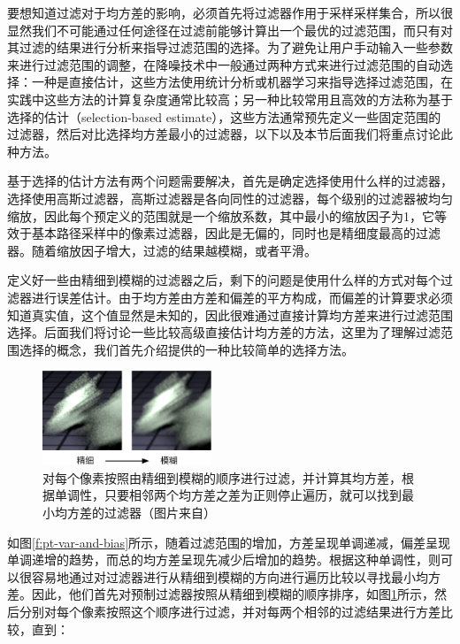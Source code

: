 要想知道过滤对于均方差的影响，必须首先将过滤器作用于采样采样集合，所以很显然我们不可能通过任何途径在过滤前能够计算出一个最优的过滤范围，而只有对其过滤的结果进行分析来指导过滤范围的选择。为了避免让用户手动输入一些参数来进行过滤范围的调整，在降噪技术中一般通过两种方式来进行过滤范围的自动选择：一种是直接估计，这些方法使用统计分析\cite{a:OnFilteringtheNoisefromtheRandomParametersinMonteCarloRendering}或机器学习\cite{a:AmachinelearningapproachforfilteringMonteCarlonoise}来指导选择过滤范围，在实践中这些方法的计算复杂度通常比较高；另一种比较常用且高效的方法称为基于选择的估计（selection-based estimate），这些方法通常预先定义一些固定范围的过滤器，然后对比选择均方差最小的过滤器，以下以及本节后面我们将重点讨论此种方法。

基于选择的估计方法有两个问题需要解决，首先是确定选择使用什么样的过滤器，\cite{a:AdaptiveSamplingandReconstructionusingGreedyErrorMinimization}选择使用高斯过滤器，高斯过滤器是各向同性的过滤器，每个级别的过滤器被均匀缩放，因此每个预定义的范围就是一个缩放系数，其中最小的缩放因子为1，它等效于基本路径采样中的像素过滤器，因此是无偏的，同时也是精细度最高的过滤器。随着缩放因子增大，过滤的结果越模糊，或者平滑。

定义好一些由精细到模糊的过滤器之后，剩下的问题是使用什么样的方式对每个过滤器进行误差估计。由于均方差由方差和偏差的平方构成，而偏差的计算要求必须知道真实值，这个值显然是未知的，因此很难通过直接计算均方差来进行过滤范围选择。后面我们将讨论一些比较高级直接估计均方差的方法，这里为了理解过滤范围选择的概念，我们首先介绍\cite{a:AdaptiveSamplingandReconstructionusingGreedyErrorMinimization}提供的一种比较简单的选择方法。

\begin{figure}
	\sidecaption
	\includegraphics[width=0.45\textwidth]{figures/pt/fine-to-coarse}
	\caption{对每个像素按照由精细到模糊的顺序进行过滤，并计算其均方差，根据单调性，只要相邻两个均方差之差为正则停止遍历，就可以找到最小均方差的过滤器（图片来自\cite{a:AdaptiveSamplingandReconstructionusingGreedyErrorMinimization}）}
	\label{f:pt-fine-to-coarse}
\end{figure}

如图\ref{f:pt-var-and-bias}所示，随着过滤范围的增加，方差呈现单调递减，偏差呈现单调递增的趋势，而总的均方差呈现先减少后增加的趋势。根据这种单调性，则可以很容易地通过对过滤器进行从精细到模糊的方向进行遍历比较以寻找最小均方差。因此，他们首先对预制过滤器按照从精细到模糊的顺序排序，如图\ref{f:pt-fine-to-coarse}所示，然后分别对每个像素按照这个顺序进行过滤，并对每两个相邻的过滤结果进行方差比较，直到：

